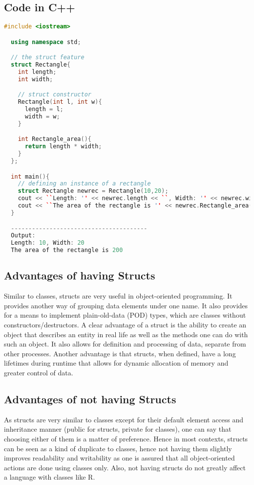 \documentclass[12pt]{article}
\begin{document}
\subsection{Code in C++}

\begin{lstlisting}[language=C++ ]
  #include <iostream>

  using namespace std;

  // the struct feature
  struct Rectangle{
    int length;
    int width;

    // struct constructor
    Rectangle(int l, int w){
      length = l;
      width = w;
    }

    int Rectangle_area(){
      return length * width;
    }
  };

  int main(){
    // defining an instance of a rectangle
    struct Rectangle newrec = Rectangle(10,20);
    cout << ``Length: '' << newrec.length << ``, Width: '' << newrec.width << endl;
    cout << ``The area of the rectangle is '' << newrec.Rectangle_area() << endl;
  }

  ---------------------------------------
  Output:
  Length: 10, Width: 20
  The area of the rectangle is 200
\end{lstlisting}

\subsection{Advantages of having Structs}
Similar to classes, structs are very useful in object-oriented programming. It provides another way of grouping data elements under one name. It also provides for a means to implement plain-old-data (POD) types, which are classes without constructors/destructors. A clear advantage of a struct is the ability to create an object that describes an entity in real life as well as the methods one can do with such an object. It also allows for definition and processing of data, separate from other processes. Another advantage is that structs, when defined, have a long lifetimes during runtime that allows for dynamic allocation of memory and greater control of data.

\subsection{Advantages of not having Structs}
As structs are very similar to classes except for their default element access and inheritance manner (public for structs, private for classes), one can say that choosing either of them is a matter of preference. Hence in most contexts, structs can be seen as a kind of duplicate to classes, hence not having them slightly improves readability and writability as one is assured that all object-oriented actions are done using classes only. Also, not having structs do not greatly affect a language with classes like R.
\end{document}
